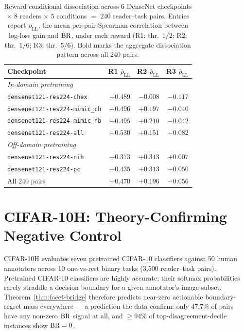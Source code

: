 \begin{table}[htbp]
\centering
\caption{Reward-conditional dissociation across $6$ DenseNet checkpoints $\times$ $8$ readers $\times$ $5$ conditions $=$ $240$ reader--task pairs.
  Entries report $\bar\rho_{\mathrm{LL}}$, the mean per-pair Spearman correlation between log-loss gain and $\operatorname{BR}$, under each reward (R1: thr.\ $1/2$; R2: thr.\ $1/6$; R3: thr.\ $5/6$).
  Bold marks the aggregate dissociation pattern across all $240$ pairs.
}
\label{tab:robustness}
\small
\begin{tabular}{@{}lrrr@{}}
\toprule
Checkpoint & R1 $\bar\rho_{\mathrm{LL}}$ & R2 $\bar\rho_{\mathrm{LL}}$ & R3 $\bar\rho_{\mathrm{LL}}$ \\
\midrule
\multicolumn{4}{l}{\textit{In-domain pretraining}} \\
\texttt{densenet121-res224-chex}      & $+0.489$ & $-0.008$ & $-0.117$ \\
\texttt{densenet121-res224-mimic\_ch} & $+0.496$ & $+0.197$ & $-0.040$ \\
\texttt{densenet121-res224-mimic\_nb} & $+0.495$ & $+0.210$ & $-0.042$ \\
\texttt{densenet121-res224-all}       & $+0.530$ & $+0.151$ & $-0.082$ \\
\midrule
\multicolumn{4}{l}{\textit{Off-domain pretraining}} \\
\texttt{densenet121-res224-nih}       & $+0.373$ & $+0.313$ & $+0.007$ \\
\texttt{densenet121-res224-pc}        & $+0.435$ & $+0.313$ & $-0.050$ \\
\midrule
All 240 pairs                         & $\mathbf{+0.470}$ & $+0.196$ & $\mathbf{-0.056}$ \\
\bottomrule
\end{tabular}
\end{table}

\section{CIFAR-10H: Theory-Confirming Negative Control}
\label{app:exp2-cifar10h}

CIFAR-10H evaluates seven pretrained CIFAR-10 classifiers against 50 human annotators across 10 one-vs-rest binary tasks (3{,}500 reader--task pairs).
Pretrained CIFAR-10 classifiers are highly accurate; their softmax probabilities rarely straddle a decision boundary for a given annotator's image subset.
Theorem~\ref{thm:facet-bridge} therefore predicts near-zero actionable boundary-regret mass everywhere --- a prediction the data confirm: only 47.7\% of pairs have any non-zero $\operatorname{BR}$ signal at all, and ${\geq}94\%$ of top-disagreement-decile instances show $\operatorname{BR}=0$.

